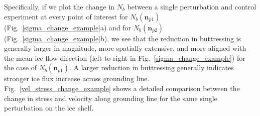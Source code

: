 \documentclass[tc, manuscript]{copernicus}
\begin{document}
 
Specifically, if we plot the change in $N_b$ between a single perturbation and control experiment at every point of interest for $N_b(\mathbf{n}_{p1})$ (Fig.~\ref{sigma_change_example}a) and for $N_b(\mathbf{n}_{p2})$ (Fig.~\ref{sigma_change_example}b), we see that the reduction in buttressing is generally larger in magnitude, more spatially extensive, and more aligned with the mean ice flow direction (left to right in Fig.~\ref{sigma_change_example}) for the case of $N_b(\mathbf{n}_{p1})$. A larger reduction in buttressing generally indicates stronger ice flux increase across grounding line. Fig.~\ref{vel_stress_change_example} shows a detailed comparison between the change in stress and velocity along grounding line for the same single perturbation on the ice shelf. 
\end{document}
